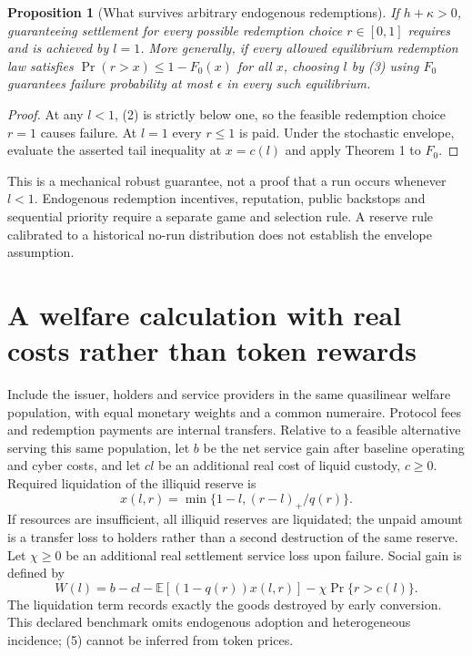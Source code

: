 \documentclass[11pt]{article}
\newtheorem{proposition}[theorem]{Proposition}
\theoremstyle{remark}
\newcommand{\E}{\mathbb E}
\begin{document}
\begin{proposition}[What survives arbitrary endogenous redemptions]
If $h+\kappa>0$, guaranteeing settlement for every possible redemption
choice $r\in[0,1]$ requires and is achieved by $l=1$. More generally,
if every allowed equilibrium redemption law satisfies
$\Pr(r>x)\leq1-F_0(x)$ for all $x$, choosing $l$ by (3) using $F_0$
guarantees failure probability at most $\epsilon$ in every such
equilibrium.
\end{proposition}
\begin{proof}
At any $l<1$, (2) is strictly below one, so the feasible redemption
choice $r=1$ causes failure. At $l=1$ every $r\leq1$ is paid. Under
the stochastic envelope, evaluate the asserted tail inequality at
$x=c(l)$ and apply Theorem 1 to $F_0$.
\end{proof}
This is a mechanical robust guarantee, not a proof that a run occurs
whenever $l<1$. Endogenous redemption incentives, reputation, public
backstops and sequential priority require a separate game and selection
rule. A reserve rule calibrated to a historical no-run distribution does
not establish the envelope assumption.

\section{A welfare calculation with real costs rather than token rewards}
Include the issuer, holders and service providers in the same quasilinear
welfare population, with equal monetary weights and a common numeraire.
Protocol fees and redemption payments are internal transfers. Relative to
a feasible alternative serving this same population, let $b$ be the net
service gain after baseline operating and cyber costs, and let $cl$ be
an additional real cost of liquid custody, $c\geq0$. Required liquidation
of the illiquid reserve is
\[
 x(l,r)=\min\{1-l,(r-l)_+/q(r)\}.                                 \tag{4}
\]
If resources are insufficient, all illiquid reserves are liquidated; the
unpaid amount is a transfer loss to holders rather than a second destruction
of the same reserve. Let $\chi\geq0$ be an additional real settlement
service loss upon failure. Social gain is defined by
\[
 W(l)=b-cl-\E[(1-q(r))x(l,r)]-\chi\Pr\{r>c(l)\}.                  \tag{5}
\]
The liquidation term records exactly the goods destroyed by early
conversion. This declared benchmark omits endogenous adoption and
heterogeneous incidence; (5) cannot be inferred from token prices.
\end{document}
